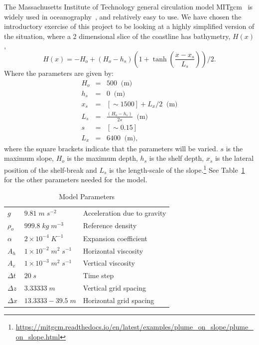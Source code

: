 \documentclass[usenames, dvipsnames, twocolumn]{article}
\begin{document}
The Massachusetts Institute of Technology general circulation model
MITgcm~\cite{marshall1998efficient, marotzke1999construction} is widely used
 in oceanography~\cite{verdy2017data}, and relatively easy to use.
We have chosen the introductory exercise of this project to be
looking at a highly simplified version of the situation,
where a 2 dimensional slice of the coastline has bathymetry, \(H(x) \),
\begin{equation}
H(x) = -H_o + (H_o - h_s) ( 1 + \tanh{\left(\frac{x-x_s}{L_s}\right)} ) / 2 .
\end{equation}
Where the parameters are given by:
\begin{eqnarray}
H_o & = & 500 \;\; \mbox{(m)} \\
h_s & = & 0 \;\; \mbox{(m)} \\
x_s & = & [\sim1500] + L_x/2 \;\; \mbox{(m)} \\
L_s & = & \frac{(H_o - h_s)}{2 s} \;\; \mbox{(m)} \\
s & = & [\sim0.15]\\
L_x & = & 6400 \;\; \mbox{(m)},
\end{eqnarray}
where the square brackets indicate that the parameters will be varied. \(s\) is the maximum slope, \(H_o\) is the maximum depth, \(h_s\) is the shelf depth, \(x_s\) is the lateral position of the shelf-break and \(L_s\) is the length-scale of the slope.\footnote{\url{https://mitgcm.readthedocs.io/en/latest/examples/plume_on_slope/plume_on_slope.html}} See Table~\ref{tab:Model_Parameters} for the other parameters needed for the model.

\begin{table}[]
    \centering
    \begin{tabular}{lll}
 \(g\)	&  \(9.81\; m\; s^{-2}\) &	Acceleration due to gravity \\
 \(\rho_o\) &	 \(999.8\;  kg\; m^{-3}\) &	Reference density \\
 \(\alpha\) &	 \(2 \times 10^{-4}\; K^{-1}\) &	Expansion coefficient \\
 \(A_h\) &	 \(1  \times 10^{-2}\; m^{2}\; s^{-1}\) & 	Horizontal viscosity \\
 \(A_v\) &	 \(1  \times 10^{-3}\; m^{2}\; s^{-1}\)	& Vertical viscosity \\
 \(\Delta t\) &	 \(20\; s\) &	Time step \\
 \(\Delta z\) &	 \(3.33333\; m\) &	Vertical grid spacing \\
 \(\Delta x\) &	 \(13.3333 - 39.5\; m\) &	Horizontal grid spacing \\
    \end{tabular}
    \caption{Model Parameters}
    \label{tab:Model_Parameters}
\end{table}
\end{document}
